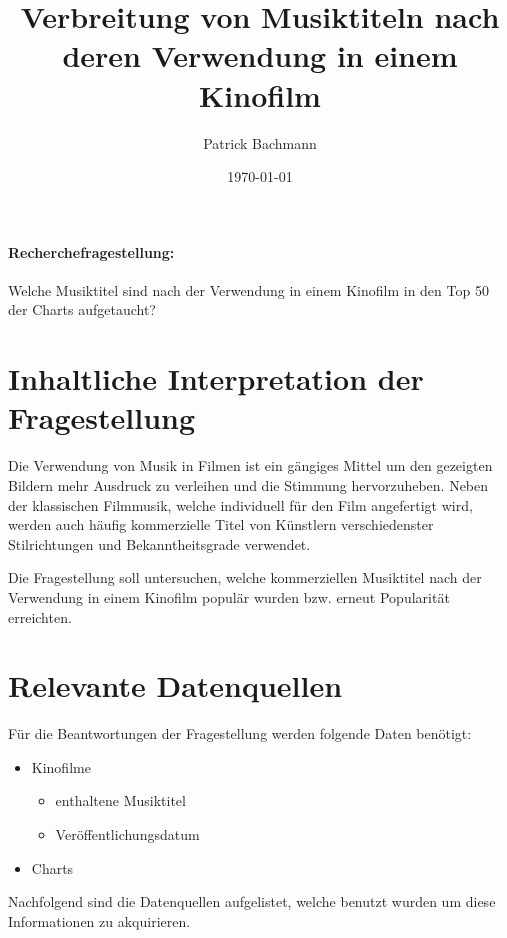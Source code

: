 \documentclass[parskip]{scrartcl}
\begin{document}
\subject{Projektdokumentation im Modul Semantic Web}
\title{Verbreitung von Musiktiteln nach deren Verwendung in einem Kinofilm}
\author{Patrick Bachmann}
\date{\today}

\maketitle


\paragraph{Recherchefragestellung: }
Welche Musiktitel sind nach der Verwendung in einem Kinofilm in den Top 50 der Charts aufgetaucht?

\section{Inhaltliche Interpretation der Fragestellung}

Die Verwendung von Musik in Filmen ist ein gängiges Mittel um den gezeigten Bildern mehr Ausdruck zu verleihen und die Stimmung hervorzuheben. Neben der klassischen Filmmusik, welche individuell für den Film angefertigt wird, werden auch häufig kommerzielle Titel von Künstlern verschiedenster Stilrichtungen und Bekanntheitsgrade verwendet.

Die Fragestellung soll untersuchen, welche kommerziellen Musiktitel nach der Verwendung in einem Kinofilm populär wurden bzw. erneut Popularität erreichten.

\pagebreak
\section{Relevante Datenquellen}

Für die Beantwortungen der Fragestellung werden folgende Daten benötigt:
\begin{itemize}
    \itemsep 1pt
    \parskip 0pt
    \parsep 0pt
    \item Kinofilme
    \begin{itemize}
            \item enthaltene Musiktitel
            \item Veröffentlichungsdatum
    \end{itemize}
        \item Charts
\end{itemize}

Nachfolgend sind die Datenquellen aufgelistet, welche benutzt wurden um diese Informationen zu akquirieren.
\end{document}
